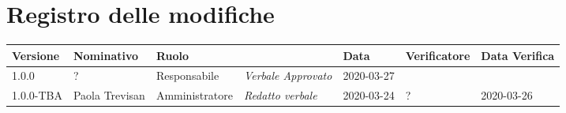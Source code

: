 \section*{Registro delle modifiche}
\renewcommand{\arraystretch}{1.8}

  \setlength\LTleft{-1.7cm}
  \begin{longtable}{|p{1.7cm}|p{2cm}|p{2.5cm}|p{3cm}|p{1.7cm}|p{2cm}|p{2.3cm}|}
    \hline

    \rowcolor{header}
    \textbf{Versione} & \textbf{Nominativo} & \textbf{Ruolo} & \centering{\textbf{Descrizione}} & \textbf{Data} & \textbf{Verificatore} & \textbf{Data Verifica}\\

    \hline
    1.0.0 & ? & Responsabile & \small{\textit{Verbale Approvato}} & 2020-03-27 & &\\
	  1.0.0-TBA & Paola Trevisan & Amministratore & \small{\textit{Redatto verbale}} & 2020-03-24 & ? & 2020-03-26 \\
    \hline
  \end{longtable}
  \setlength\LTleft{0cm}
